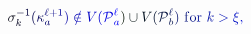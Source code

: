 \documentclass[12pt]{article}
\begin{document}
\makeatletter
\renewcommand*{\@textcolor}[3]{%
  \protect\leavevmode
  \begingroup
    \color#1{#2}#3%
  \endgroup
}
\makeatother
\begin{displaymath}
\mathcolor[RGB]{0,0,15}{\sigma} _ { \mathcolor[RGB]{0,0,30}{k} } ^ { \mathcolor[RGB]{0,0,45}{-} \mathcolor[RGB]{0,0,60}{1} } \mathcolor[RGB]{0,0,75}{(} \mathcolor[RGB]{0,0,90}{\kappa} _ { \mathcolor[RGB]{0,0,105}{a} } ^ { \mathcolor[RGB]{0,0,120}{\ell} \mathcolor[RGB]{0,0,135}{+} \mathcolor[RGB]{0,0,150}{1} } \mathcolor[RGB]{0,0,165}{)} \mathcolor[RGB]{0,0,180}{\notin} \mathcolor[RGB]{0,0,195}{V} \mathcolor[RGB]{0,0,210}{(} \mathcal { \mathcolor[RGB]{0,0,225}{P} } _ { \mathcolor[RGB]{0,0,240}{a} } ^ { \mathcolor[RGB]{0,0,255}{\ell} } \mathcolor[RGB]{0,15,0}{)} \mathcolor[RGB]{0,15,15}{\cup} \mathcolor[RGB]{0,15,30}{V} \mathcolor[RGB]{0,15,45}{(} \mathcal { \mathcolor[RGB]{0,15,60}{P} } _ { \mathcolor[RGB]{0,15,75}{b} } ^ { \mathcolor[RGB]{0,15,90}{\ell} } \mathcolor[RGB]{0,15,105}{)} \mathrm { ~ \mathcolor[RGB]{0,15,120}{f} \mathcolor[RGB]{0,15,135}{o} \mathcolor[RGB]{0,15,150}{r} ~ } \mathcolor[RGB]{0,15,165}{k} \mathcolor[RGB]{0,15,180}{>} \mathcolor[RGB]{0,15,195}{\xi} \mathcolor[RGB]{0,15,210}{,}
\end{displaymath}
\end{document}
